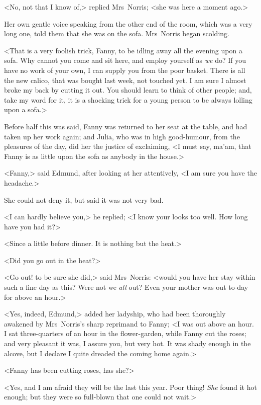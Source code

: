 <No, not that I know of,> replied Mrs~Norris; <she was here a moment ago.>

Her own gentle voice speaking from the other end of the room, which was a very long one, told them that she was on the sofa. Mrs~Norris began scolding.

<That is a very foolish trick, Fanny, to be idling away all the evening upon a sofa. Why cannot you come and sit here, and employ yourself as \textit{we}  do? If you have no work of your own, I can supply you from the poor basket. There is all the new calico, that was bought last week, not touched yet. I am sure I almost broke my back by cutting it out. You should learn to think of other people; and, take my word for it, it is a shocking trick for a young person to be always lolling upon a sofa.>

Before half this was said, Fanny was returned to her seat at the table, and had taken up her work again; and Julia, who was in high good-humour, from the pleasures of the day, did her the justice of exclaiming, <I must say, ma'am, that Fanny is as little upon the sofa as anybody in the house.>

<Fanny,> said Edmund, after looking at her attentively, <I am sure you have the headache.>

She could not deny it, but said it was not very bad.

<I can hardly believe you,> he replied; <I know your looks too well. How long have you had it?>

<Since a little before dinner. It is nothing but the heat.>

<Did you go out in the heat?>

<Go out! to be sure she did,> said Mrs~Norris: <would you have her stay within such a fine day as this? Were not we \textit{all}  out? Even your mother was out to-day for above an hour.>

<Yes, indeed, Edmund,> added her ladyship, who had been thoroughly awakened by Mrs~Norris's sharp reprimand to Fanny; <I was out above an hour. I sat three-quarters of an hour in the flower-garden, while Fanny cut the roses; and very pleasant it was, I assure you, but very hot. It was shady enough in the alcove, but I declare I quite dreaded the coming home again.>

<Fanny has been cutting roses, has she?>

<Yes, and I am afraid they will be the last this year. Poor thing! \textit{She}  found it hot enough; but they were so full-blown that one could not wait.>

